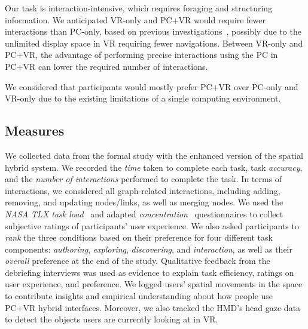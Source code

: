  \label{hypo:int} Our task is interaction-intensive, which requires foraging and structuring information. We anticipated VR-only and PC+VR would require fewer interactions than PC-only, based on previous investigations~\cite{lisle2020evaluating,in2023table}, possibly due to the unlimited display space in VR requiring fewer navigations. 
Between VR-only and PC+VR, the advantage of performing precise interactions using the PC in PC+VR can lower the required number of interactions.
 

 \label{hypo:pre} We considered that participants would mostly prefer PC+VR over PC-only and VR-only due to the existing limitations of a single computing environment.

\subsection{Measures}
We collected data from the formal study with the enhanced version of the spatial hybrid system.
We recorded the \textit{time} taken to complete each task, task \textit{accuracy}, and the \textit{number of interactions} performed to complete the task.
In terms of interactions, we considered all graph-related interactions, including adding, removing, and updating nodes/links, as well as merging nodes.
We used the \textit{NASA TLX task load}~\cite{sandra2006nasatlx} and adapted \textit{concentration}~\cite{novak2000measuring} questionnaires to collect subjective ratings of participants' user experience.
We also asked participants to \textit{rank} the three conditions based on their preference for four different task components: \textit{authoring}, \textit{exploring}, \textit{discovering}, and \textit{interaction}, as well as their \textit{overall} preference at the end of the study. 
Qualitative feedback from the debriefing interviews was used as evidence to explain task efficiency, ratings on user experience, and preference.
We logged users' spatial movements in the space to contribute insights and empirical understanding about how people use PC+VR hybrid interfaces.
Moreover, we also tracked the HMD’s head gaze data to detect the objects users are currently looking at in VR.
